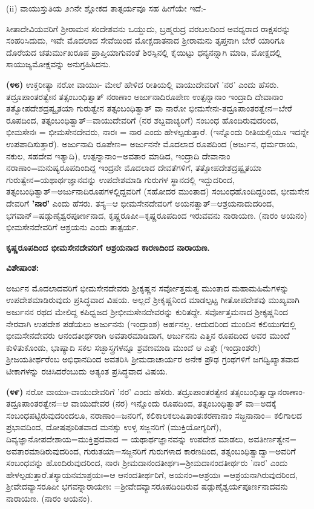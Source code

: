 (ii) ವಾಯುಸ್ತುತಿಯ ೨೧ನೇ ಶ್ಲೋಕದ ತಾತ್ಸರ್ಯವೂ ಸಹ ಹೀಗೆಯೇ ಇದೆ:-

ಸೀತಾದೇವಿಯವರಿಗೆ ಶ‍್ರೀರಾಮನ ಸಂದೇಶವನು ಒಯ್ದುದು, ಬ್ರಹ್ಮರುದ್ರ ವರಬಲದಿಂದ ಅವಧ್ಯರಾದ ರಾಕ್ಷಸರನ್ನು ಸಂಹರಿಸಿದುದು, ಇವೇ ಮೊದಲಾದ ಸೇವೆಯಿಂದ ಮೋಕ್ಷದಾತನಾದ ಶ‍್ರೀರಾಮನು ತೃಪ್ತನಾಗಿ ಬೇರೆ ಯಾರಿಗೂ ದೊರೆಯದ ಚತುರ್ಮುಖರೂಪ ಪ್ರಾಪ್ತಿಯಾಗುವಂತೆ ಶಿರಸ್ಸಿನಲ್ಲಿ ಕೈಯಿಟ್ಟು ಧನ್ಯನನ್ನಾಗಿ ಮಾಡಿ, ಮೋಕ್ಷದಲ್ಲಿ ಸಾಯುಜ್ಯಮೋಕ್ಷವನ್ನು ಅನುಗ್ರಹಿಸಿದನು.

\textbf{(೪೮)} ಉಕ್ತರೀತ್ಯಾ ನರೋ ವಾಯುಃ- ಮೇಲೆ ಹೇಳಿದ ರೀತಿಯಲ್ಲಿ ವಾಯುದೇವರಿಗೆ 'ನರ' ಎಂದು ಹೆಸರು. ತದ್ರೂಪಾಂತರತ್ವೇನ ತತ್ಸಂಬಂಧಿತ್ವಾತ್ ನರಾಣಾಂ ಅರ್ಜುನಾದಿರೂಪೇಣ ಉತ್ಪನ್ನಾನಾಂ ಇಂದ್ರಾದಿ ದೇವಾನಾಂ ತತ್ವೋಪದೇಶದ್ರಷ್ವೃತಯಾ ಗುರುತ್ವೇನ ತತ್ಸಂಬಂಧಿತ್ವಾತ್ ವಾ ನಾರೋ ಭೀಮಸೇನಃ-ತದ್ರೂಪಾಂತರತ್ವೇನ=ಬೇರೆ ರೂಪದಿಂದ, ತತ್ಸಂಬಂಧಿತ್ವಾತ್=ವಾಯುದೇವರಿಗೆ (ನರ ಶಬ್ದವಾಚ್ಯರಿಗೆ) ಸಂಬಂಧ ಹೊಂದಿರುವುದರಿಂದ, ಭೀಮಸೇನಃ = ಭೀಮಸೇನದೇವರು, ನಾರಃ = ನಾರ ಎಂದು ಹೇಳಲ್ಪಡುತ್ತಾರೆ. (ಇನ್ನೊಂದು ರೀತಿಯಲ್ಲಿಯೂ ಇದನ್ನೇ ಉಪಪಾದಿಸುತ್ತಾರೆ). ಅರ್ಜುನಾದಿ ರೂಪೇಣ= ಅರ್ಜುನನೇ ಮೊದಲಾದ ರೂಪದಿಂದ (ಅರ್ಜುನ, ಧರ್ಮರಾಯ, ನಕುಲ, ಸಹದೇವ ಇತ್ಯಾದಿ), ಉತ್ಪನ್ನಾನಾಂ=ಅವತಾರ ಮಾಡಿದ, ಇಂದ್ರಾದಿ ದೇವಾನಾಂ ನರಾಣಾಂ=ಮನುಷ್ಯರೂಪ\-ದಿಂದಿದ್ದ ಇಂದ್ರನೇ ಮೊದಲಾದ ದೇವತೆಗಳಿಗೆ, ತತ್ತೋಪದೇಶದ್ರಷ್ಟೃತಯಾ ಗುರುತ್ವೇನ=\-ಯಥಾರ್ಥಜ್ಞಾನವನ್ನು ಉಪದೇಶಮಾಡಿ ಗುರುಗಳ ಸ್ಥಾನದಲ್ಲಿ ಇದ್ದುದರಿಂದ, ತತ್ಸಂಬಂಧಿ\-ತ್ವಾತ್=ಅರ್ಜುನಾದಿರೂಪಗಳಲ್ಲಿದ್ದವರಿಗೆ (ಸಹೋದರ ಮುಂತಾದ) ಸಂಬಂಧಹೊಂದಿದ್ದರಿಂದ, ಭೀಮಸೇನ ದೇವರಿಗೆ \textbf{'ನಾರ'} ಎಂದು ಹೆಸರು. ತಸ್ಯ=ಆ ಭೀಮಸೇನದೇವರಿಗೆ ಅಯನತ್ವಾತ್=ಆಶ್ರಯನಾದುದರಿಂದ, ಭಗವಾನ್=ಷಡ್ಗುಣೈಶ್ವರಪೂರ್ಣನಾದ, ಕೃಷ್ಣರೂಪೀ=ಕೃಷ್ಣರೂಪದಿಂದ ಇರುವವನು ನಾರಾಯಣ. (ನಾರಂ ಅಯನಂ) ಭೀಮಸೇನದೇವರಿಗೆ ಆಶ್ರಯನು ಎಂದು ತಾತ್ಪರ್ಯ.

\begin{center}
\textbf{ಕೃಷ್ಣರೂಪದಿಂದ ಭೀಮಸೇನದೇವರಿಗೆ ಆಶ್ರಯನಾದ ಕಾರಣದಿಂದ ನಾರಾಯಣ.}
\end{center}

\noindent
\textbf{ವಿಶೇಷಾಂಶ:\enginline{-}}

ಅರ್ಜುನ ಮೊದಲಾದವರಿಗೆ ಭೀಮಸೇನದೇವರು ಶ‍್ರೀಕೃಷ್ಣನ ಸರ್ವೋತ್ತಮತ್ವ ಮುಂತಾದ ಮಹಾಮಹಿಮೆಗಳನ್ನು ಉಪದೇಶಮಾಡಿರುವುದು ಪ್ರಸಿದ್ಧವಾದ ವಿಷಯ. ಅಲ್ಲದೆ ಶ‍್ರೀಕೃಷ್ಣ\-ನಿಂದ ಮಾಡಲ್ಪಟ್ಟ ಗೀತೋಪದೇಶವು ಮುಖ್ಯವಾಗಿ ಅರ್ಜುನನ ರಥದ ಮೇಲಿದ್ದ ಕಪಿಧ್ವಜದ ಶ‍್ರೀಭೀಮಸೇನದೇವರನ್ನು ಕುರಿತದ್ದೇ. ಸರ್ವೋತ್ತಮನಾದ ಶ‍್ರೀಕೃಷ್ಣನಿಂದ ನೇರವಾಗಿ ಉಪದೇಶ ಪಡೆಯಲು ಅರ್ಜುನನು (ಇಂದ್ರಾಂಶ) ಅರ್ಹನಲ್ಲ. ಆದುದರಿಂದ ಮುಂದಿನ ಕಲಿಯುಗದಲ್ಲಿ ಭೀಮಸೇನದೇವರು ಆನಂದತೀರ್ಥರಾಗಿ ಅವತಾರಮಾಡಿದಾಗ, ಅರ್ಜುನನು ಎತ್ತಿನ ರೂಪದಿಂದ ಅವರ ಮುಂದೆ ಕುಳಿತುಕೊಂಡು, ಭಾಷ್ಯಾದಿ ಸಕಲ ಸಚ್ಛಾಸ್ತ್ರಗಳನ್ನೂ ಶ್ರವಣಮಾಡಿ ಮುಂದೆ ಆ ಎತ್ತೇ (ಇಂದ್ರಾಂಶರೇ) ಶ‍್ರೀಜಯತೀರ್ಥರೆಂಬ ಅಭಿಧಾನದಿಂದ ಅವತರಿಸಿ ಶ‍್ರೀಮದಾಚಾರ್ಯರ ಅನೇಕ ಪ್ರೌಢ ಗ್ರಂಥಗಳಿಗೆ ಜಗದ್ವಿಖ್ಯಾತವಾದ ಟೀಕಾಗಳನ್ನು ರಚಿಸಿದರೆಂಬುದು ಅತ್ಯಂತ ಪ್ರಸಿದ್ಧವಾದ ವಿಷಯ.

\textbf{(೪೯)} ನರೋ ವಾಯುಃ-ವಾಯುದೇವರಿಗೆ 'ನರ' ಎಂದು ಹೆಸರು. ತದ್ರೂಪಾಂತರತ್ವೇನ ತತ್ಸಂಬಂಧಿತ್ವಾದ್ವಾನರಾಣಾಂ-ತದ್ರೂಪಾಂತರತ್ವೇನ=ಆ ವಾಯುದೇವರ (ನರ) ಇನ್ನೊಂದು ರೂಪದಿಂದ, ತತ್ಸಂಬಂಧಿತ್ವಾತ್ ವಾ=ಅದಕ್ಕೆ ಸಂಬಂಧಪಟ್ಟಿರುವುದರಿಂದಲೂ, ನರಾಣಾಂ=ಜನರಿಗೆ, ಕಲಿಕಾಲಕಲುಷಿತಾಂತಃಕರಣಾನಾಂ ಸಜ್ಜನಾನಾಂ= ಕಲಿಗಾಲದ ಪ್ರಭಾವದಿಂದ, ದೋಷಪೂರಿತವಾದ ಮನಸ್ಸು ಉಳ್ಳ ಸಜ್ಜನರಿಗೆ (ಮುಕ್ತಿಯೋಗ್ಯರಿಗೆ), ದಿವ್ಯಜ್ಞಾನೋಪದೇಶಾಯ=ಮುಕ್ತಿಪ್ರದವಾದ = ಯಥಾರ್ಥಜ್ಞಾನವನ್ನು ಉಪದೇಶ ಮಾಡಲು, ಅವತೀರ್ಣತ್ವೇನ= ಅವತಾರಮಾಡಿರುವುದರಿಂದ, ಗುರುತಯಾ=ಸಜ್ಜನರಿಗೆ ಗುರುಗಳಾದ ಕಾರಣದಿಂದ, ತತ್ಸಂಬಂಧಿತ್ವಾದ್ವಾ=ಅವರಿಗೆ ಸಂಬಂಧವನ್ನು ಹೊಂದಿರುವುದರಿಂದ, ನಾರಃ ಶ‍್ರೀಮದಾನಂದ\-ತೀರ್ಥಃ=ಶ‍್ರೀಮದಾನಂದತೀರ್ಥರು 'ನಾರ' ಎಂದು ಹೇಳಲ್ಪಡುತ್ತಾರೆ.\break ತಸ್ಯಾಯನಮಾ\-ಶ್ರಯಃ=ಆ ಆನಂದತೀರ್ಥರಿಗೆ, ಅಯನಂ=ಆಶ್ರಯಃ =ಆಶ್ರಯನಾಗಿರುವುದರಿಂದ, ಶ‍್ರೀವೇದವ್ಯಾಸರೂಪೀ ಭಗವನ್ನಾರಾಯಣಃ =ಶ‍್ರೀವೇದವ್ಯಾಸರೂಪದಿಂದಿರುವ ಷಡ್ಗುಣೈ\-ಶ್ವರ್ಯಪೂರ್ಣನಾದವನು ನಾರಾಯಣ. (ನಾರಂ ಅಯನಂ).

